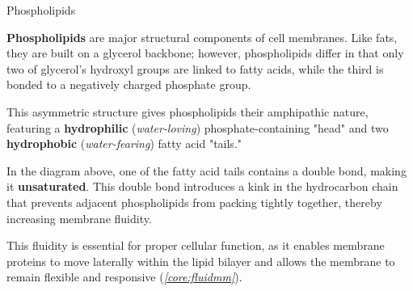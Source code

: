 \documentclass[10pt]{article}
\begin{document}
    \begin{core}{Phospholipids}

      \textbf{Phospholipids} are major structural components of cell membranes. Like fats, they are built on a glycerol backbone; however, phospholipids differ in that only two of glycerol's hydroxyl groups are linked to fatty acids, while the third is bonded to a negatively charged phosphate group. 

      This asymmetric structure gives phospholipids their amphipathic nature, featuring a \textbf{hydrophilic} (\textit{water-loving}) phosphate-containing "head" and two \textbf{hydrophobic} (\textit{water-fearing}) fatty acid "tails."


      In the diagram above, one of the fatty acid tails contains a double bond, making it \textbf{unsaturated}. This double bond introduces a kink in the hydrocarbon chain that prevents adjacent phospholipids from packing tightly together, thereby increasing membrane fluidity.

      This fluidity is essential for proper cellular function, as it enables membrane proteins to move laterally within the lipid bilayer and allows the membrane to remain flexible and responsive (\textit{\autoref{core:fluidmm}}).

    \end{core}
\end{document}
